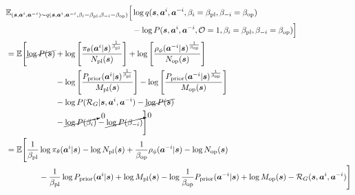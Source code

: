 \begin{equation}
    \begin{aligned}
        &\begin{aligned}[t]
            \mathbb{E}_{(\boldsymbol{s}, \boldsymbol{a}^i, \boldsymbol{a}^{-i}) \sim q(\boldsymbol{s}, \boldsymbol{a}^i, \boldsymbol{a}^{-i}, \beta_i = \beta_{\text{pl}}, \beta_{-i} = \beta_{\text{op}})}\Big[ &\log q(\boldsymbol{s}, \boldsymbol{a}^i, \boldsymbol{a}^{-i}, \beta_i = \beta_{\text{pl}}, \beta_{-i} = \beta_{\text{op}}) \\
            &- \log P(\boldsymbol{s}, \boldsymbol{a}^i, \boldsymbol{a}^{-i}, \mathcal{O} = 1, \beta_i = \beta_{\text{pl}}, \beta_{-i} = \beta_{\text{op}}) \Big]
        \end{aligned} \\
        &= \begin{aligned}[t]
            \mathbb{E}\Bigg[\cancel{\log P(\boldsymbol{s})} &+\log \left[\frac{\pi_{\theta}(\boldsymbol{a}^i |\boldsymbol{s})^{\frac{1}{\beta_{\text{pl}}}}}{N_{\text{pl}}(\boldsymbol{s})}\right] + \log \left[ \frac{\rho_{\phi}(\boldsymbol{a}^{-i} |\boldsymbol{s})^{\frac{1}{\beta_{\text{op}}}}}{N_{\text{op}}(\boldsymbol{s})} \right] \\
            &- \log\left[\frac{P_{\text{prior}}(\boldsymbol{a}^i | \boldsymbol{s})^{\frac{1}{\beta_{\text{pl}}}}}{M_{\text{pl}}(\boldsymbol{s})}\right] -\log\left[ \frac{P_{\text{prior}}(\boldsymbol{a}^{-i} |\boldsymbol{s})^{\frac{1}{\beta_{\text{op}}}}}{M_{\text{op}}(\boldsymbol{s})}\right] \\
            &- \log P(\mathcal{R}_G | \boldsymbol{s}, \boldsymbol{a}^i, \boldsymbol{a}^{-i})-\cancel{\log P(\boldsymbol{s})}  \\
            &- \cancelto{0}{\log P(\beta_i)} - \cancelto{0}{\log P(\beta_{-i})}\Bigg] 
        \end{aligned}  \\
        &=\begin{aligned}[t]
            \mathbb{E}\Bigg[\frac{1}{\beta_{\text{pl}}}&\log \pi_{\theta}(\boldsymbol{a}^i |\boldsymbol{s}) - \log N_{\text{pl}}(\boldsymbol{s}) + \frac{1}{\beta_{\text{op}}}\rho_{\phi}(\boldsymbol{a}^{-i} |\boldsymbol{s}) - \log N_{\text{op}}(\boldsymbol{s}) \\
            &- \frac{1}{\beta_{\text{pl}}}\log P_{\text{prior}}(\boldsymbol{a}^i | \boldsymbol{s}) + \log M_{\text{pl}}(\boldsymbol{s})  -\log \frac{1}{\beta_{\text{op}}}P_{\text{prior}}(\boldsymbol{a}^{-i} |\boldsymbol{s}) + \log M_{\text{op}}(\boldsymbol{s}) - \mathcal{R}_{G}(\boldsymbol{s}, \boldsymbol{a}^i, \boldsymbol{a}^{-i})\Bigg] 

\end{aligned}
\end{aligned}
\end{equation}
